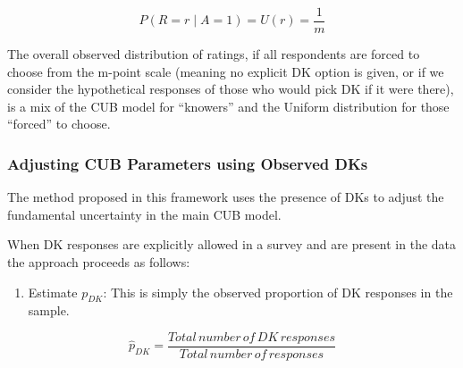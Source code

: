 \documentclass[
  letterpaper,
  DIV=11,
  numbers=noendperiod]{scrartcl}
\providecommand{\tightlist}{%
  \setlength{\itemsep}{0pt}\setlength{\parskip}{0pt}}\usepackage{longtable,booktabs,array}
\begin{document}
\[
P(R = r\mid A =1) =U(r)= \frac{1}{m}
\]

The overall observed distribution of ratings, if all respondents are
forced to choose from the m-point scale (meaning no explicit DK option
is given, or if we consider the hypothetical responses of those who
would pick DK if it were there), is a mix of the CUB model for
``knowers'' and the Uniform distribution for those ``forced'' to choose.

\hypertarget{adjusting-cub-parameters-using-observed-dks}{%
\subsubsection{Adjusting CUB Parameters using Observed
DKs}\label{adjusting-cub-parameters-using-observed-dks}}

The method proposed in this framework uses the presence of DKs to adjust
the fundamental uncertainty in the main CUB model.

When DK responses are explicitly allowed in a survey and are present in
the data the approach proceeds as follows:

\begin{enumerate}
\def\labelenumi{\arabic{enumi}.}
\tightlist
\item
  Estimate \(p_{DK}\): This is simply the observed proportion of DK
  responses in the sample.
\end{enumerate}

\[
 \hat{p}_{DK} = \frac{Total\, number\, of\, DK\, responses}{Total\, number\, of\, responses}
 \]
\end{document}
